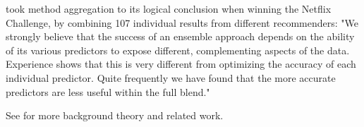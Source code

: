 \cite{Bell2007} took method aggregation to its logical conclusion when winning the Netflix Challenge,
by combining 107 individual results from different recommenders: 
"We strongly believe that the success of an ensemble approach depends on the ability of its various predictors to expose different, 
complementing aspects of the data. Experience shows that this is very different from optimizing the accuracy of each individual predictor. 
Quite frequently we have found that the more accurate predictors are less useful within the full blend." \cite[p6]{Bell2007}

See \cite{Bjorkoy2011} for more background theory and related work.
